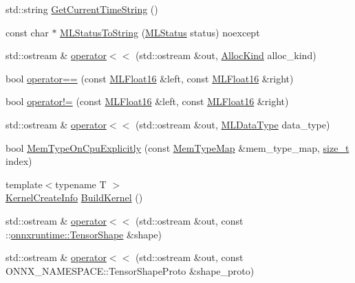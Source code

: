 \begin{DoxyCompactItemize}
\item 
std\+::string \mbox{\hyperlink{namespaceonnxruntime_aeded1386a822529bd9acd10c9148c04a}{Get\+Current\+Time\+String}} ()
\item 
const char $\ast$ \mbox{\hyperlink{namespaceonnxruntime_ac569cd1c6513266641c006ed2bf5e0d9}{M\+L\+Status\+To\+String}} (\mbox{\hyperlink{namespaceonnxruntime_a8e92b0a23759ea70b95aff5087add622}{M\+L\+Status}} status) noexcept
\item 
std\+::ostream \& \mbox{\hyperlink{namespaceonnxruntime_a37b22921c708227212dd09d25521ff93}{operator$<$$<$}} (std\+::ostream \&out, \mbox{\hyperlink{namespaceonnxruntime_a96c3d8f2cb52b6f3e388d72f37e6fc7c}{Alloc\+Kind}} alloc\+\_\+kind)
\item 
bool \mbox{\hyperlink{namespaceonnxruntime_a85d9f4ce255300d63e45549fc9c073ba}{operator==}} (const \mbox{\hyperlink{uniononnxruntime_1_1MLFloat16}{M\+L\+Float16}} \&left, const \mbox{\hyperlink{uniononnxruntime_1_1MLFloat16}{M\+L\+Float16}} \&right)
\item 
bool \mbox{\hyperlink{namespaceonnxruntime_a8dda757b485429e9c2674c863c5cd47a}{operator!=}} (const \mbox{\hyperlink{uniononnxruntime_1_1MLFloat16}{M\+L\+Float16}} \&left, const \mbox{\hyperlink{uniononnxruntime_1_1MLFloat16}{M\+L\+Float16}} \&right)
\item 
std\+::ostream \& \mbox{\hyperlink{namespaceonnxruntime_a7e5dbb4b07ee5e49ad3dcdd97c926a5b}{operator$<$$<$}} (std\+::ostream \&out, \mbox{\hyperlink{namespaceonnxruntime_ad77d0a6e838ec7da5dc35fed5ee66b49}{M\+L\+Data\+Type}} data\+\_\+type)
\item 
bool \mbox{\hyperlink{namespaceonnxruntime_afa996ec85090645ef69ad3a7e3eb6ddd}{Mem\+Type\+On\+Cpu\+Explicitly}} (const \mbox{\hyperlink{namespaceonnxruntime_ad53d5ace215052258a4346ee68c2624e}{Mem\+Type\+Map}} \&mem\+\_\+type\+\_\+map, \mbox{\hyperlink{mlasi_8h_a503efbc1c6e50825320ad909366b78ab}{size\+\_\+t}} index)
\item 
{\footnotesize template$<$typename T $>$ }\\\mbox{\hyperlink{structonnxruntime_1_1KernelCreateInfo}{Kernel\+Create\+Info}} \mbox{\hyperlink{namespaceonnxruntime_ac7d6fcc4957abf36800a00b296827813}{Build\+Kernel}} ()
\item 
std\+::ostream \& \mbox{\hyperlink{namespaceonnxruntime_a593517991ad6342492078022c80da708}{operator$<$$<$}} (std\+::ostream \&out, const \+::\mbox{\hyperlink{classonnxruntime_1_1TensorShape}{onnxruntime\+::\+Tensor\+Shape}} \&shape)
\item 
std\+::ostream \& \mbox{\hyperlink{namespaceonnxruntime_a9e563626aaf5aadb70ad636c14b07af2}{operator$<$$<$}} (std\+::ostream \&out, const O\+N\+N\+X\+\_\+\+N\+A\+M\+E\+S\+P\+A\+C\+E\+::\+Tensor\+Shape\+Proto \&shape\+\_\+proto)

\end{DoxyCompactItemize}
